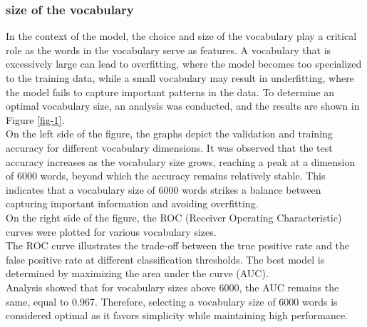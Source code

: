 \documentclass{class}
\begin{document}
\subsubsection*{size of the vocabulary}
In the context of the model, the choice and size of the vocabulary play a critical role as the words in the vocabulary serve as features.
A vocabulary that is excessively large can lead to overfitting, where the model becomes too specialized to the training data, while a small
vocabulary may result in underfitting, where the model fails to capture important patterns in the data. To determine an optimal vocabulary size,
an analysis was conducted, and the results are shown in Figure \ref{fig-1}.\\
On the left side of the figure, the graphs depict the validation and training accuracy for different vocabulary dimensions.
It was observed that the test accuracy increases as the vocabulary size grows, reaching a peak at a dimension of 6000 words,
beyond which the accuracy remains relatively stable. This indicates that a vocabulary size of 6000 words strikes a balance between capturing
important information and avoiding overfitting.\\
On the right side of the figure, the ROC (Receiver Operating Characteristic) curves were plotted for various vocabulary sizes.\\
The ROC curve illustrates the trade-off between the true positive rate and the false positive rate at different classification thresholds.
The best model is determined by maximizing the area under the curve (AUC).\\
Analysis showed that for vocabulary sizes above 6000, the AUC remains the same, equal to 0.967.
Therefore, selecting a vocabulary size of 6000 words is considered optimal as it favors simplicity while maintaining high performance.
\end{document}
